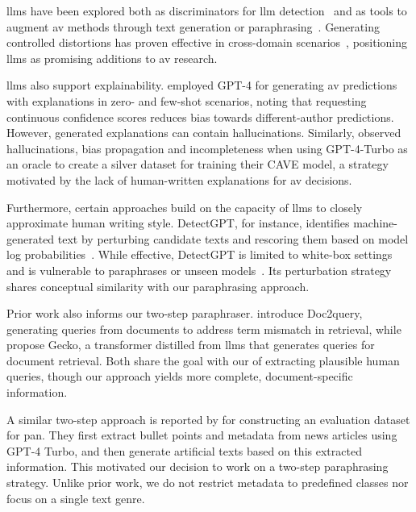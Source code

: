 \acp{llm} have been explored both as discriminators for \ac{llm} detection~\citep{futrzynski_pairwise_2021} and as tools to augment \ac{av} methods through text generation or paraphrasing~\citep{mao_raidar_2024,baradia_mirror_2025}. 
Generating controlled distortions has proven effective in cross-domain scenarios~\citep{bischoff_importance_2020}, positioning \acp{llm} as promising additions to \ac{av} research.

\acp{llm} also support explainability. 
\citet{hung_xai_av_llm_2023} employed GPT-4 for generating \ac{av} predictions with explanations in zero- and few-shot scenarios, noting that requesting continuous confidence scores reduces bias towards different-author predictions. 
However, generated explanations can contain hallucinations. 
Similarly, \citet{ramnath_cave_xai_llm_2025} observed hallucinations, bias propagation and incompleteness when using GPT-4-Turbo as an oracle to create a silver dataset for training their CAVE model, a strategy motivated by the lack of human-written explanations for \ac{av} decisions.

Furthermore, certain approaches build on the capacity of \acp{llm} to closely approximate human writing style.
DetectGPT, for instance, identifies machine-generated text by perturbing candidate texts and rescoring them based on model log probabilities~\citep{mitchell_detectgpt_2023}. 
While effective, DetectGPT is limited to white-box settings and is vulnerable to paraphrases or unseen models~\citep{Wu_ODD_challenges_2025}. 
Its perturbation strategy shares conceptual similarity with our paraphrasing approach.

Prior work also informs our two-step paraphraser. 
\citet{nogueira_doc2query_2019} introduce Doc2query, generating queries from documents to address term mismatch in retrieval, while \citet{lee_gecko_2024} propose Gecko, a transformer distilled from \acp{llm} that generates queries for document retrieval. 
Both share the goal with our \pextractor{} of extracting plausible human queries, though our approach yields more complete, document-specific information.

A similar two-step approach is reported by \citet{bevendorff_overview_2024} for constructing an evaluation dataset for \acs{pan}.
They first extract bullet points and metadata from news articles using GPT-4 Turbo, and then generate artificial texts based on this extracted information. 
This motivated our decision to work on a two-step paraphrasing strategy. 
Unlike prior work, we do not restrict metadata to predefined classes nor focus on a single text genre.

